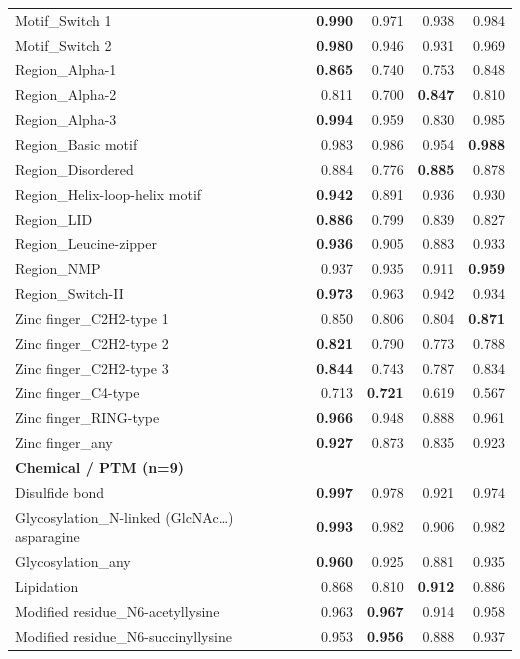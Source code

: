 \documentclass{article}
\begin{document}
\begin{longtable}{p{6.0cm}rrrr}
Motif\_Switch 1 & \textbf{0.990} & 0.971 & 0.938 & 0.984 \\
Motif\_Switch 2 & \textbf{0.980} & 0.946 & 0.931 & 0.969 \\
Region\_Alpha-1 & \textbf{0.865} & 0.740 & 0.753 & 0.848 \\
Region\_Alpha-2 & 0.811 & 0.700 & \textbf{0.847} & 0.810 \\
Region\_Alpha-3 & \textbf{0.994} & 0.959 & 0.830 & 0.985 \\
Region\_Basic motif & 0.983 & 0.986 & 0.954 & \textbf{0.988} \\
Region\_Disordered & 0.884 & 0.776 & \textbf{0.885} & 0.878 \\
Region\_Helix-loop-helix motif & \textbf{0.942} & 0.891 & 0.936 & 0.930 \\
Region\_LID & \textbf{0.886} & 0.799 & 0.839 & 0.827 \\
Region\_Leucine-zipper & \textbf{0.936} & 0.905 & 0.883 & 0.933 \\
Region\_NMP & 0.937 & 0.935 & 0.911 & \textbf{0.959} \\
Region\_Switch-II & \textbf{0.973} & 0.963 & 0.942 & 0.934 \\
Zinc finger\_C2H2-type 1 & 0.850 & 0.806 & 0.804 & \textbf{0.871} \\
Zinc finger\_C2H2-type 2 & \textbf{0.821} & 0.790 & 0.773 & 0.788 \\
Zinc finger\_C2H2-type 3 & \textbf{0.844} & 0.743 & 0.787 & 0.834 \\
Zinc finger\_C4-type & 0.713 & \textbf{0.721} & 0.619 & 0.567 \\
Zinc finger\_RING-type & \textbf{0.966} & 0.948 & 0.888 & 0.961 \\
Zinc finger\_any & \textbf{0.927} & 0.873 & 0.835 & 0.923 \\
\multicolumn{5}{l}{\textbf{Chemical / PTM (n=9)}} \\
Disulfide bond & \textbf{0.997} & 0.978 & 0.921 & 0.974 \\
Glycosylation\_N-linked (GlcNAc\ldots{}) asparagine & \textbf{0.993} & 0.982 & 0.906 & 0.982 \\
Glycosylation\_any & \textbf{0.960} & 0.925 & 0.881 & 0.935 \\
Lipidation & 0.868 & 0.810 & \textbf{0.912} & 0.886 \\
Modified residue\_N6-acetyllysine & 0.963 & \textbf{0.967} & 0.914 & 0.958 \\
Modified residue\_N6-succinyllysine & 0.953 & \textbf{0.956} & 0.888 & 0.937 \\

\end{longtable}
\end{document}
